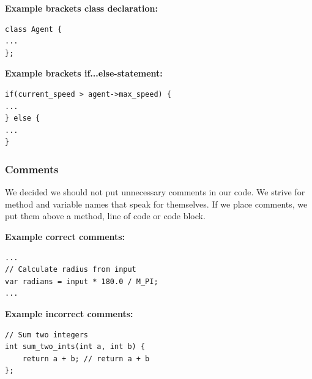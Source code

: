 \textbf{Example brackets class declaration:}
\begin{lstlisting}
class Agent {
...
};
\end{lstlisting}

\textbf{Example brackets if...else-statement:}
\begin{lstlisting}
if(current_speed > agent->max_speed) {
...
} else {
... 
}
\end{lstlisting}

\subsubsection{Comments}
We decided we should not put unnecessary comments in our code. We strive for method and variable names that speak for themselves. If we place comments, we put them above a method, line of code or code block.

\textbf{Example correct comments:}
\begin{lstlisting}
...
// Calculate radius from input
var radians = input * 180.0 / M_PI;
...
\end{lstlisting}

\textbf{Example incorrect comments:}
\begin{lstlisting}
// Sum two integers
int sum_two_ints(int a, int b) {
	return a + b; // return a + b
};
\end{lstlisting}
